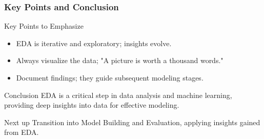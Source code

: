 \documentclass{beamer}
\begin{document}
\begin{frame}[fragile]
    \frametitle{Key Points and Conclusion}
    \begin{block}{Key Points to Emphasize}
        \begin{itemize}
            \item EDA is iterative and exploratory; insights evolve.
            \item Always visualize the data; "A picture is worth a thousand words."
            \item Document findings; they guide subsequent modeling stages.
        \end{itemize}
    \end{block}
    
    \begin{block}{Conclusion}
        EDA is a critical step in data analysis and machine learning, providing deep insights into data for effective modeling.
    \end{block}

    \begin{block}{Next up}
        Transition into Model Building and Evaluation, applying insights gained from EDA.
    \end{block}
\end{frame}
\end{document}
